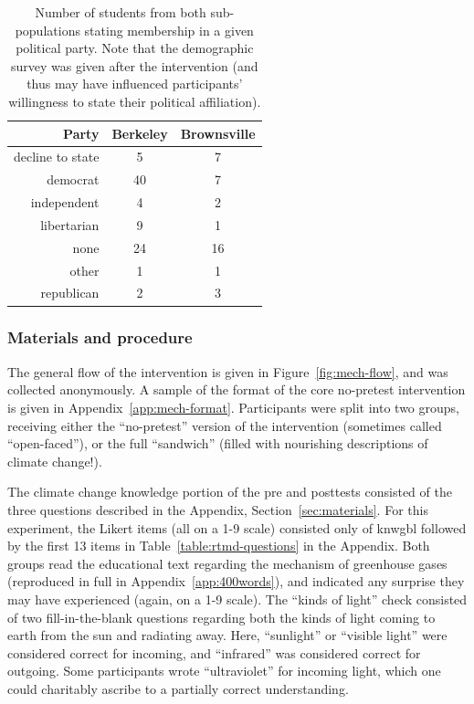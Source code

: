\begin{table}
    \centering
    \caption{Number of students from both sub-populations stating membership in
        a given political party. Note that the demographic survey was given
        after the intervention (and thus may have influenced participants'
        willingness to state their political affiliation).}
    \label{table:study1-affiliation}
    \begin{tabular}{rcc}
        \toprule
        Party & Berkeley & Brownsville \\
        \midrule
          decline to state &   5  & 7 \\
          democrat &  40  & 7 \\
          independent &   4  & 2 \\
          libertarian &   9  & 1 \\
          none &  24   & 16 \\
          other &   1  & 1 \\
          republican &   2  & 3 \\
        \bottomrule
    \end{tabular}
\end{table}

\subsubsection{Materials and procedure}

The general flow of the intervention is given in Figure~\ref{fig:mech-flow}, and
was collected anonymously.  A sample of the format of the core no-pretest
intervention is given in Appendix~\ref{app:mech-format}. Participants were split
into two groups, receiving either the “no-pretest” version of the intervention
(sometimes called “open-faced”), or the full “sandwich” (filled with nourishing
descriptions of climate change!). 

The climate change knowledge portion of the pre and posttests consisted of the
three questions described in the Appendix, Section~\ref{sec:materials}. For this
experiment, the Likert items (all on a 1-9 scale) consisted only of
\textsf{knwgbl} followed by the first 13 items in
Table~\ref{table:rtmd-questions} in the Appendix. Both groups read the
educational text regarding the mechanism of greenhouse gases (reproduced in
full in Appendix~\ref{app:400words}), and indicated any surprise they may have
experienced (again, on a 1-9 scale). The “kinds of light” check consisted of two
fill-in-the-blank questions regarding both the kinds of light coming to earth from
the sun and radiating away. Here, “sunlight” or “visible light” were considered
correct for incoming, and “infrared” was considered correct for outgoing.  Some
participants wrote “ultraviolet” for incoming light, which one could charitably
ascribe to a partially correct understanding.

